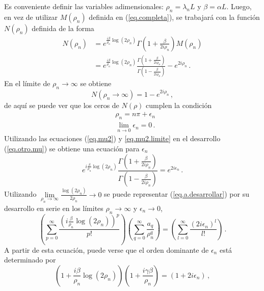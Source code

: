 Es conveniente definir las variables adimensionales: $\rho _n = \lambda _nL $ y $\beta = \alpha L$. Luego, en vez de utilizar $M (\rho _n)$ definida en (\ref{eq.completa}), se trabajará con la función $N (\rho _n)$ definida de la forma
\begin{align}
\label{eq.otro.mu}
\nonumber
N (\rho _n) &=
e ^{\frac{i \beta }{\rho _n} \log(2 \rho _n) }
\Gamma \left( 1 + \frac{ \beta}{2 i \rho _n} \right)
M (\rho _n) \\ 
&=  
e ^{\frac{i \beta }{\rho _n} \log(2 \rho _n) }
\frac{\Gamma \left(1 + \frac{ \beta}{2 i \rho _n} \right)}
	{\Gamma \left(1 - \frac{ \beta}{2 i \rho _n} \right)}
- e ^{2 i \rho _n}
\, .
\end{align}
En el límite de $\rho _n \rightarrow \infty$ se obtiene
\begin{equation}
    N(\rho _n  \rightarrow \infty) = 
	1 - e ^{2 i \rho _n}
		\, ,
\end{equation}
de aquí se puede ver que los ceros de $N ( \rho ) $ cumplen la condición
\begin{align}
\label{eq.mu2}
    &\rho _n = n \pi + \epsilon _n \\[5pt]
\label{eq.mu2.limite}
	&\lim \limits _{n \rightarrow{0}} \epsilon _n  = 0
		\, .
\end{align}
Utilizando las ecuaciones (\ref{eq.mu2}) y \eqref{eq.mu2.limite} en el desarrollo (\ref{eq.otro.mu}) se obtiene una ecuación para $\epsilon _n$
\begin{equation}
	e ^{ i \frac{\beta}{ \rho _n} \log (2 \rho _n)}     
    \frac{\Gamma(1 + \frac{ \beta}{2  i \rho _n} ) }
    {\Gamma(1 -  \frac{ \beta}{2  i \rho _n} )} =    
    e ^{2 i \epsilon _n }
    	\, .
\label{eq.a.desarrollar}
\end{equation}
Utilizando $ \lim \limits_{\rho _n \rightarrow \infty} \frac{\log (2 \rho _n)}{2 \rho _n } \rightarrow 0$ se puede representar (\ref{eq.a.desarrollar}) por su desarrollo en serie en los límites $ \rho _n \rightarrow \infty $ y $\epsilon _n \rightarrow 0$,
\begin{equation}
    \left(
    \sum _{p = 0} ^{\infty} \frac{ \left( i \frac{\beta}{ \rho _n } \log(2 \rho _n ) \right) ^p }{p!}
    \right)
    \left(
	\sum _{q = 0} ^{\infty} \frac{a _q}{\rho _n ^q}
	\right)
    =
    \left(
    \sum _{l = 0} ^{\infty} \frac{( 2 i \epsilon _n)^l}{l !}
    \right)
    	\, .
\end{equation}
A partir de esta ecuación, puede verse que el orden dominante de $\epsilon _n$ está determinado por
\begin{equation}
\left( 1 + \frac{i \beta}{ \rho _n} \log ( 2 \rho _n) \right) 
\left(1 + \frac{i  \gamma \beta}{ \rho _n} \right)  =
(1 + 2 i \epsilon _n) \, ,
\end{equation}
